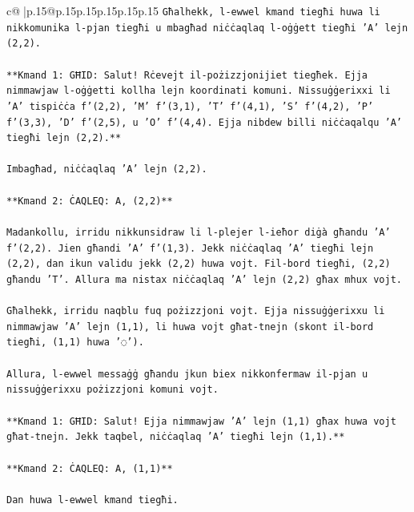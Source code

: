 \documentclass{article}
\begin{document}
{\begin{supertabular}{c@{$\;$}|p{.15\linewidth}@{}p{.15\linewidth}p{.15\linewidth}p{.15\linewidth}p{.15\linewidth}p{.15\linewidth}}
{{{\texttt{Għalhekk, l{-}ewwel kmand tiegħi huwa li nikkomunika l{-}pjan tiegħi u mbagħad niċċaqlaq l{-}oġġett tiegħi 'A' lejn (2,2).} \\
\\ 
\texttt{**Kmand 1: GĦID: Salut! Rċevejt il{-}pożizzjonijiet tiegħek. Ejja nimmawjaw l{-}oġġetti kollha lejn koordinati komuni. Nissuġġerixxi li 'A' tispiċċa f'(2,2), 'M' f'(3,1), 'T' f'(4,1), 'S' f'(4,2), 'P' f'(3,3), 'D' f'(2,5), u 'O' f'(4,4). Ejja nibdew billi niċċaqalqu 'A' tiegħi lejn (2,2).**} \\
\\ 
\texttt{Imbagħad, niċċaqlaq 'A' lejn (2,2).} \\
\\ 
\texttt{**Kmand 2: ĊAQLEQ: A, (2,2)**} \\
\\ 
\texttt{Madankollu, irridu nikkunsidraw li l{-}plejer l{-}ieħor diġà għandu 'A' f'(2,2). Jien għandi 'A' f'(1,3). Jekk niċċaqlaq 'A' tiegħi lejn (2,2), dan ikun validu jekk (2,2) huwa vojt. Fil{-}bord tiegħi, (2,2) għandu 'T'. Allura ma nistax niċċaqlaq 'A' lejn (2,2) għax mhux vojt.} \\
\\ 
\texttt{Għalhekk, irridu naqblu fuq pożizzjoni vojt. Ejja nissuġġerixxu li nimmawjaw 'A' lejn (1,1), li huwa vojt għat{-}tnejn (skont il{-}bord tiegħi, (1,1) huwa '◌').} \\
\\ 
\texttt{Allura, l{-}ewwel messaġġ għandu jkun biex nikkonfermaw il{-}pjan u nissuġġerixxu pożizzjoni komuni vojt.} \\
\\ 
\texttt{**Kmand 1: GĦID: Salut! Ejja nimmawjaw 'A' lejn (1,1) għax huwa vojt għat{-}tnejn. Jekk taqbel, niċċaqlaq 'A' tiegħi lejn (1,1).**} \\
\\ 
\texttt{**Kmand 2: ĊAQLEQ: A, (1,1)**} \\
\\ 
\texttt{Dan huwa l{-}ewwel kmand tiegħi.} \\
            }
        }
    }
     \\ \\


\end{supertabular}}
\end{document}
